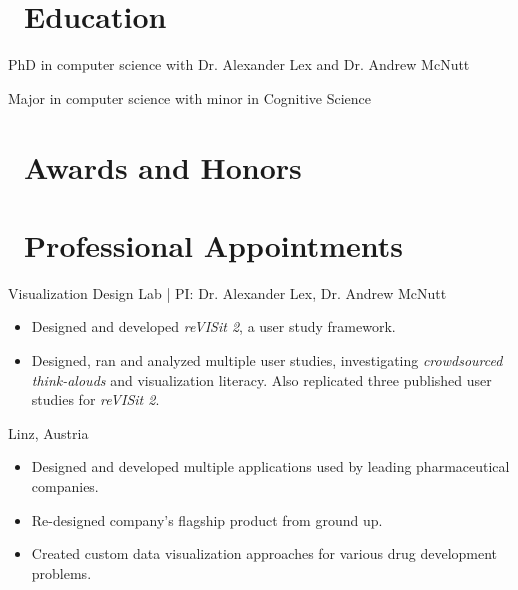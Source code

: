 
\section{\faGraduationCap\  Education}
PhD in computer science with Dr. Alexander Lex and Dr. Andrew McNutt

Major in computer science with minor in Cognitive Science


\section{\faStar\ Awards and Honors}
\vspace{2mm}
\vspace{2mm}


\section{\faBriefcase\ Professional Appointments}

Visualization Design Lab | PI: Dr. Alexander Lex, Dr. Andrew McNutt
\begin{itemize}
  \item Designed and developed \textit{reVISit 2}, a user study framework.
  \item Designed, ran and analyzed multiple user studies, investigating \textit{crowdsourced think-alouds} and visualization literacy. Also replicated three published user studies for \textit{reVISit 2}.
\end{itemize}

Linz, Austria
\begin{itemize}
  \item Designed and developed multiple applications used by leading pharmaceutical companies.
  \item Re-designed company’s flagship product from ground up.
  \item Created custom data visualization approaches for various drug development problems.
\end{itemize}

